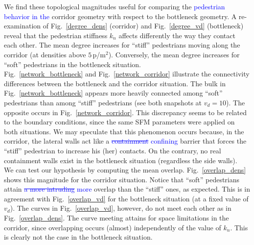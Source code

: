 \documentclass[preprint,12pt]{elsarticle}
\begin{document}
We find these topological magnitudes useful for comparing the 
\textcolor{blue}{pedestrian behavior in the} 
corridor geometry with respect to the bottleneck geometry. A re-examination of 
Fig.~\ref{degree_dens} (corridor) and Fig.~\ref{degree_vd} (bottleneck) reveal 
that the pedestrian stiffness $k_n$ affects differently the way they contact 
each other. The mean degree increases for ``stiff'' pedestrians moving along 
the corridor (at densities above $5\,$p/m$^2$). Conversely, the mean degree 
increases for ``soft'' pedestrians in the bottleneck situation.\\  

Fig.~\ref{network_bottleneck} and 
Fig.~\ref{network_corridor} illustrate the connectivity differences between 
the bottleneck and the corridor situation. The bulk in 
Fig.~\ref{network_bottleneck} appears more heavily connected among ``soft'' 
pedestrians than among ``stiff'' pedestrians (see both snapshots at $v_d=10$). 
The opposite occurs in Fig.~\ref{network_corridor}. This discrepancy seems to 
be related to the boundary conditions, since the same SFM parameters were 
applied on both situations. We may speculate that this phenomenon occurs 
because, in the corridor, the lateral walls act like a \textcolor{blue}{\sout{containment}
confining} barrier that 
forces the ``stiff'' pedestrian to increase his (her) contacts. On the contrary, 
no real containment walls exist in the bottleneck situation (regardless the side 
walls). \\



We can test our hypothesis by computing the mean overlap. 
Fig.~\ref{overlap_dens} shows this magnitude for the corridor situation. Notice 
that ``soft'' pedestrians attain \textcolor{blue}{\sout{a more intruding} more } overlap than the ``stiff'' 
ones, as expected. This is in agreement with Fig.~\ref{overlap_vd} for the 
bottleneck situation (at a fixed value of $v_d$). The curves in 
Fig.~\ref{overlap_vd}, however, do not meet each other as in  
Fig.~\ref{overlap_dens}. The curve meeting attains for space limitations in 
the corridor, since overlapping occurs (almost) independently of the value of
$k_n$. This is clearly not the case in the bottleneck situation. \\
\end{document}
